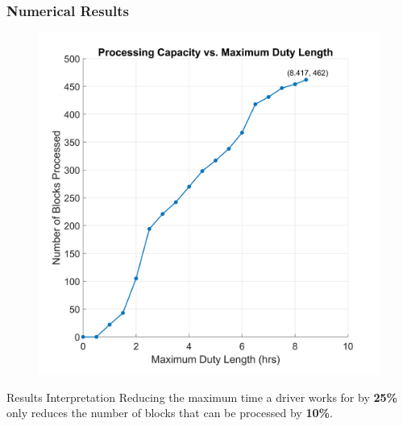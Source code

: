 \documentclass[handout]{beamer}
\begin{document}
\begin{frame}
	\frametitle{Numerical Results}
	\vspace{\baselineskip}
	\begin{figure}%
        \centering
        \includegraphics[width=0.4\linewidth]{Images/1-D1M3.png}
        \label{fig:1-D1M1}%
    \end{figure}
    
        \begin{block}{Results Interpretation}
		Reducing the maximum time a driver works for by \textbf{25\%} only reduces the number of blocks that can be processed by \textbf{10\%}.
	\end{block}
    	\vspace{\baselineskip}
    	\vspace{\baselineskip}
\end{frame}

\end{document}
